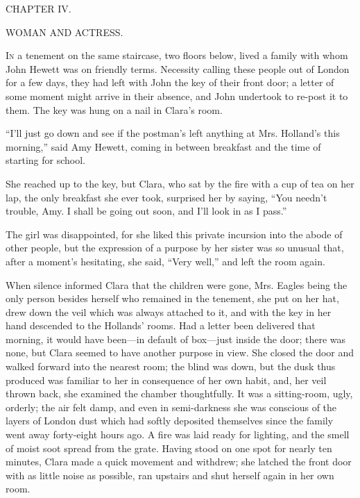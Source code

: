 {}

{CHAPTER IV.}

WOMAN AND ACTRESS.

\textsc{In} a tenement on the same staircase, two floors below, lived a
family with whom John Hewett was on friendly terms. Necessity calling
these people out of London for a few days, they had left with John the
key of their front door; a letter of some moment might arrive in their
absence, and John undertook to re-post it to them. The key was hung on a
nail in Clara's room.

``I'll just go down and see if the postman's left anything at Mrs.
Holland's this morning,'' said Amy Hewett, coming in between breakfast
and the time of starting for school.

She reached up to the key, but Clara, who sat by the fire with a cup of
tea on her lap, the only breakfast she ever took, surprised her by
saying, ``You needn't trouble, Amy. I shall be going out soon, and I'll
look in as I pass.''

{}The girl was disappointed, for she liked this private incursion into
the abode of other people, but the expression of a purpose by her sister
was so unusual that, after a moment's hesitating, she said, ``Very
well,'' and left the room again.

When silence informed Clara that the children were gone, Mrs. Eagles
being the only person besides herself who remained in the tenement, she
put on her hat, drew down the veil which was always attached to it, and
with the key in her hand descended to the Hollands' rooms. Had a letter
been delivered that morning, it would have been---in default of
box---just inside the door; there was none, but Clara seemed to have
another purpose in view. She closed the door and walked forward into the
nearest room; the blind was down, but the dusk thus produced was
familiar to her in consequence of her own habit, and, her veil thrown
back, she examined the chamber thoughtfully. It was a sitting-room,
ugly, orderly; the air felt damp, and even in semi-darkness she was
conscious of the layers of London dust which had softly deposited
themselves since the family went away forty-eight hours ago. A {}fire
was laid ready for lighting, and the smell of moist soot spread from the
grate. Having stood on one spot for nearly ten minutes, Clara made a
quick movement and withdrew; she latched the front door with as little
noise as possible, ran upstairs and shut herself again in her own room.

